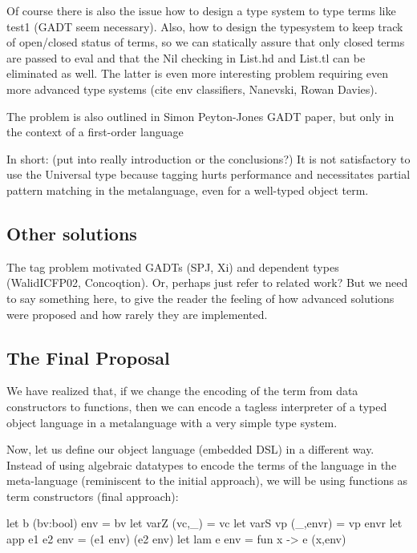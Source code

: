 Of course there is also the issue how to design a type system to type
terms like test1 (GADT seem necessary). Also, how to design the
typesystem to keep track of open/closed status of terms, so we can
statically assure that only closed terms are passed to eval and that
the Nil checking in List.hd and List.tl can be eliminated as well. The
latter is even more interesting problem requiring even more advanced
type systems (cite env classifiers, Nanevski, Rowan Davies).

The problem is also outlined in Simon Peyton-Jones GADT paper, but
only in the context of a first-order language

In short: (put into really introduction or the conclusions?)
It is not satisfactory
to use the Universal type because tagging hurts performance and
necessitates partial pattern matching in the metalanguage, even for a
well-typed object term.  


\subsection{Other solutions}
The tag problem motivated GADTs (SPJ, Xi) and dependent types
(WalidICFP02, Concoqtion). Or, perhaps just refer to related work?
But we need to say something here, to give the reader the feeling of
how advanced solutions were proposed and how rarely they are implemented.


\subsection{The Final Proposal}
We have realized that, if we change the encoding of the term from data
constructors to functions, then we can encode a tagless interpreter of a
typed object language in a metalanguage with a very simple type system.


Now, let us define our object language (embedded DSL) in a different
way. Instead of using algebraic datatypes to encode the terms of the
language in the meta-language (reminiscent to the initial approach),
we will be using functions as term constructors (final approach):

\begin{code}
  let b (bv:bool) env = bv
  let varZ (vc,_) = vc
  let varS vp (_,envr) = vp envr
  let app e1 e2 env = (e1 env) (e2 env)
  let lam e env = fun x -> e (x,env)
\end{code}

